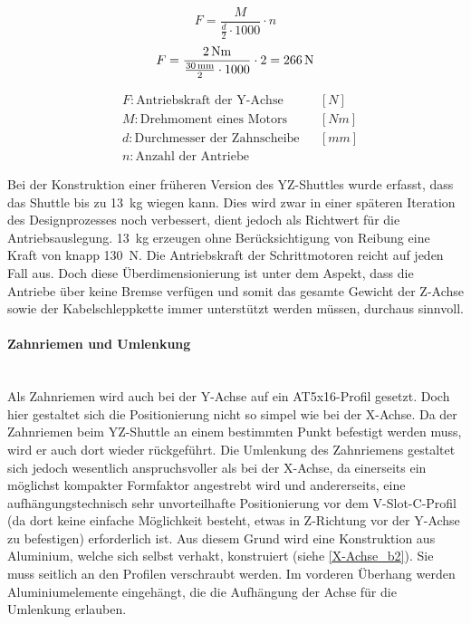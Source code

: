 \vspace{5mm}
\noindent\begin{minipage}{\textwidth}
\begin{minipage}[t]{0.5\textwidth}
    \begin{equation*}
        F = \frac{M}{\frac{d}{2} \cdot 1000} \cdot n
    \end{equation*}
    \begin{equation*}
        F = \frac{2 \, \mathrm{Nm}}{\frac{30 \, \mathrm{mm}}{2} \cdot 1000} \cdot 2 = 266 \, \mathrm{N}
    \end{equation*}
\end{minipage}%
\begin{minipage}[t]{0.4\textwidth}
    \vspace*{-5mm}
    \begin{align*}
        &F: \text{Antriebskraft der Y-Achse} & &\left[N\right]\\
        &M: \text{Drehmoment eines Motors} & &\left[Nm\right]\\
        &d: \text{Durchmesser der Zahnscheibe} & &\left[mm\right]\\
        &n: \text{Anzahl der Antriebe} & &
    \end{align*}
\end{minipage}
\end{minipage}
\vspace{5mm}

Bei der Konstruktion einer früheren Version des YZ-Shuttles wurde erfasst, dass das Shuttle bis zu \SI{13}{\kg} wiegen kann. Dies wird zwar in einer späteren Iteration des Designprozesses noch verbessert, dient jedoch als Richtwert für die Antriebsauslegung. \SI{13}{kg} erzeugen ohne Berücksichtigung von Reibung eine Kraft von knapp  \SI{130}{\newton}. Die Antriebskraft der Schrittmotoren reicht auf jeden Fall aus. Doch diese Überdimensionierung ist unter dem Aspekt, dass die Antriebe über keine Bremse verfügen und somit das gesamte Gewicht der Z-Achse sowie der Kabelschleppkette immer unterstützt werden müssen, durchaus sinnvoll.

\paragraph{Zahnriemen und Umlenkung}\mbox{}\\
Als Zahnriemen wird auch bei der Y-Achse auf ein AT5x16-Profil gesetzt. Doch hier gestaltet sich die Positionierung nicht so simpel wie bei der X-Achse. Da der Zahnriemen beim YZ-Shuttle an einem bestimmten Punkt befestigt werden muss, wird er auch dort wieder rückgeführt. Die Umlenkung des Zahnriemens gestaltet sich jedoch wesentlich anspruchsvoller als bei der X-Achse, da einerseits ein möglichst kompakter Formfaktor angestrebt wird und andererseits, eine aufhängungstechnisch sehr unvorteilhafte Positionierung vor dem V-Slot-C-Profil (da dort keine einfache Möglichkeit besteht, etwas in Z-Richtung vor der Y-Achse zu befestigen) erforderlich ist. Aus diesem Grund wird eine Konstruktion aus Aluminium, welche sich selbst verhakt, konstruiert (siehe \ref{X-Achse_b2}). Sie muss seitlich an den Profilen verschraubt werden. Im vorderen Überhang werden Aluminiumelemente eingehängt, die die Aufhängung der Achse für die Umlenkung erlauben.

